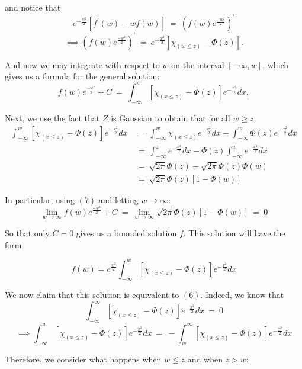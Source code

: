 \documentclass[12pt]{article}
\newcommand{\eq }{\: = \:}
\theoremstyle{nonumberplain}
\begin{document}
and notice that 
$$
e^{-\frac{w^{2}}{2}}[f^{\prime}(w)-wf(w)] \eq  (f(w)e^{\frac{-w^{2}}{2}})^{\prime}
$$
$$
\implies (f(w)e^{\frac{-w^{2}}{2}})^{\prime} \eq  e^{-\frac{w^{2}}{2}}[\chi_{(w\leq z)}-\Phi(z)].
$$

And now we may integrate with respect to $w$ on the interval $[-\infty, w]$, which gives us a formula for the general solution:
\begin{equation}
f(w)e^{\frac{-w^{2}}{2}} + C\eq  \int_{-\infty}^{w}[\chi_{(x\leq z)}-\Phi(z)]e^{-\frac{x^{2}}{2}}dx,
\end{equation}

Next, we use the fact that $Z$ is Gaussian to obtain that for all $w \ge z$:
\begin{align*}
\int_{-\infty}^{w}[\chi_{(x\leq z)}-\Phi(z)]e^{-\frac{x^{2}}{2}}dx &\eq
\int_{-\infty}^{w}\chi_{(x\leq z)}e^{-\frac{x^{2}}{2}}dx -\int_{-\infty}^{w}\Phi(z)e^{-\frac{x^{2}}{2}}dx\\
&\eq \int_{-\infty}^{z}e^{-\frac{x^{2}}{2}}dx  - \Phi(z)\int_{-\infty}^{w}e^{-\frac{x^{2}}{2}}dx\\
&\eq \sqrt{2\pi}\Phi(z) - \sqrt{2\pi}\Phi(z)\Phi(w)\\ &\eq \sqrt{2\pi}\Phi(z)[1 - \Phi(w)]
\end{align*}

In particular, using $(7)$ and letting $w \rightarrow \infty$:
$$
\lim_{w\to\infty} f(w)e^{\frac{-w^{2}}{2}} + C
\eq \lim_{w\to\infty} \sqrt{2\pi}\Phi(z)[1 - \Phi(w)] \eq 0
$$

So that only $C=0$ gives us a bounded solution $f$. This solution will have the form

$$
f(w) = e^{\frac{w^2}{2}}\int_{-\infty}^{w}[\chi_{(x\leq z)}-\Phi(z)]e^{-\frac{x^{2}}{2}}dx
$$

We now claim that this solution is equivalent to $(6)$. Indeed, we know that 
$$
\int_{-\infty}^{\infty} [\chi_{(x\leq z)}-\Phi(z)]e^{-\frac{x^{2}}{2}}dx \eq 0
$$
$$
\implies \int_{-\infty}^{w} [\chi_{(x\leq z)}-\Phi(z)]e^{-\frac{x^{2}}{2}}dx \eq 
-\int_{w}^{\infty} [\chi_{(x\leq z)}-\Phi(z)]e^{-\frac{x^{2}}{2}}dx 
$$

Therefore, we consider what happens when $w \le z$ and when $z > w$:
\end{document}
